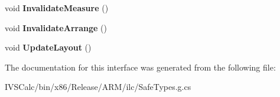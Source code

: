 \begin{DoxyCompactItemize}
void {\bfseries Invalidate\+Measure} ()
\item 
\mbox{\label{interface_windows_1_1_u_i_1_1_xaml_1_1_i_u_i_element_aac9b7aa8b7e9841562d377013cf574d7}} 
void {\bfseries Invalidate\+Arrange} ()
\item 
\mbox{\label{interface_windows_1_1_u_i_1_1_xaml_1_1_i_u_i_element_af7acd3e9383678b8386d4a908b7037ea}} 
void {\bfseries Update\+Layout} ()
\end{DoxyCompactItemize}


The documentation for this interface was generated from the following file\+:\begin{DoxyCompactItemize}
\item 
I\+V\+S\+Calc/bin/x86/\+Release/\+A\+R\+M/ilc/Safe\+Types.\+g.\+cs\end{DoxyCompactItemize}
